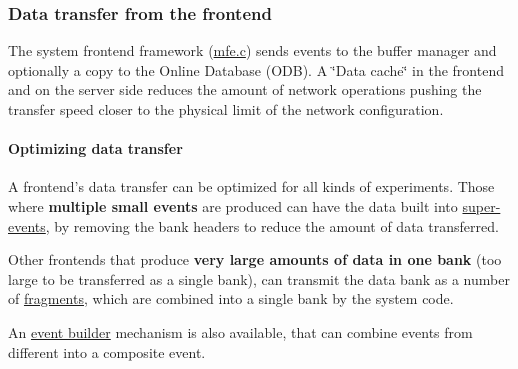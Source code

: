 \label{FrontendOperation_idx_data_transfer_optimize}
\hypertarget{FrontendOperation_idx_data_transfer_optimize}{}
 \hypertarget{FrontendOperation_FE_data_transfer}{}\subsubsection{Data transfer from the frontend}\label{FrontendOperation_FE_data_transfer}
The system frontend framework (\hyperlink{mfe_8c}{mfe.c}) sends events to the buffer manager and optionally a copy to the Online Database (ODB). A \char`\"{}Data cache\char`\"{} in the frontend and on the server side reduces the amount of network operations pushing the transfer speed closer to the physical limit of the network configuration.\hypertarget{FrontendOperation_FE_optimize_transfer}{}\paragraph{Optimizing data transfer}\label{FrontendOperation_FE_optimize_transfer}
A frontend's data transfer can be optimized for all kinds of experiments. Those where {\bfseries  multiple small events } are produced can have the data built into \hyperlink{FE_Super_Event}{super-\/events}, by removing the bank headers to reduce the amount of data transferred.

Other frontends that produce {\bfseries  very large amounts of data in one bank } (too large to be transferred as a single bank), can transmit the data bank as a number of \hyperlink{FE_eq_event_routines_FE_fragmented_event}{fragments}, which are combined into a single bank by the system code.

An \hyperlink{FE_Event_Builder}{event builder} mechanism is also available, that can combine events from different into a composite event.

